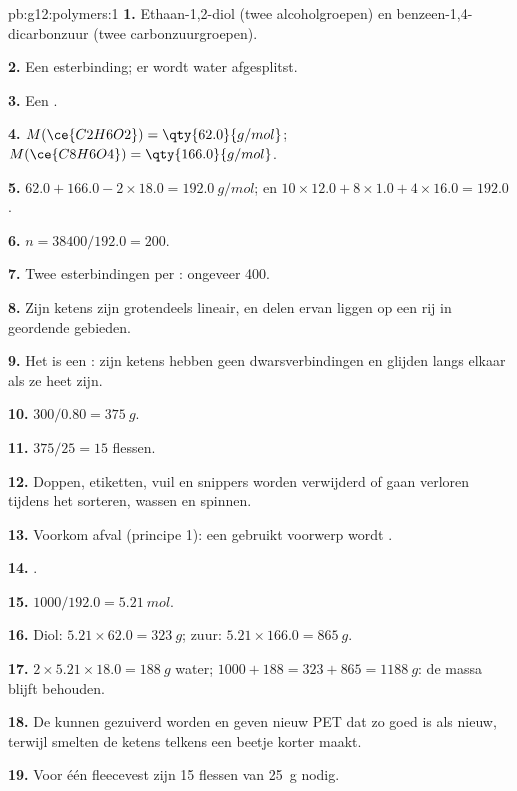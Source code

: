 \begin{solution}{pb:g12:polymers:1}
\textbf{1.} Ethaan-1,2-diol (twee alcoholgroepen) en
benzeen-1,4-dicarbonzuur (twee carbonzuurgroepen).

\textbf{2.} Een esterbinding; er wordt water afgesplitst.

\textbf{3.} Een .

\textbf{4.} $M(\ce{C2H6O2}) = \qty{62.0}{g/mol}$; $M(\ce{C8H6O4}) =
\qty{166.0}{g/mol}$.

\textbf{5.} $62.0 + 166.0 - 2 \times 18.0 = \qty{192.0}{g/mol}$; en
$10 \times 12.0 + 8 \times 1.0 + 4 \times 16.0 = 192.0$.

\textbf{6.} $n = 38400/192.0 = 200$.

\textbf{7.} Twee esterbindingen per : ongeveer 400.

\textbf{8.} Zijn ketens zijn grotendeels lineair, en delen ervan liggen
op een rij in geordende gebieden.

\textbf{9.} Het is een : zijn ketens hebben geen
dwarsverbindingen en glijden langs elkaar als ze heet zijn.

\textbf{10.} $300/0.80 = \qty{375}{g}$.

\textbf{11.} $375/25 = 15$ flessen.

\textbf{12.} Doppen, etiketten, vuil en snippers worden verwijderd of
gaan verloren tijdens het sorteren, wassen en spinnen.

\textbf{13.} Voorkom afval (principe 1): een gebruikt voorwerp wordt
.

\textbf{14.} .

\textbf{15.} $1000/192.0 = \qty{5.21}{mol}$.

\textbf{16.} Diol: $5.21 \times 62.0 = \qty{323}{g}$; zuur:
$5.21 \times 166.0 = \qty{865}{g}$.

\textbf{17.} $2 \times 5.21 \times 18.0 = \qty{188}{g}$ water;
$1000 + 188 = 323 + 865 = \qty{1188}{g}$: de massa blijft behouden.

\textbf{18.} De  kunnen gezuiverd worden en geven nieuw PET dat
zo goed is als nieuw, terwijl smelten de ketens telkens een beetje
korter maakt.

\textbf{19.} Voor één fleecevest zijn 15 flessen van \qty{25}{g} nodig.
\end{solution}
